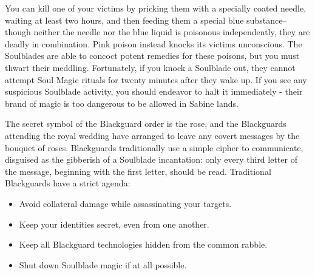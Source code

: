\documentclass[blue]{Kos}
\begin{document}
You can kill one of your victims by pricking them with a specially coated needle, waiting at least two hours, and then feeding them a special blue substance-- though neither the needle nor the blue liquid is poisonous independently, they are deadly in combination. Pink poison instead knocks its victims unconscious. The Soulblades are able to concoct potent remedies for these poisons, but you must thwart their meddling. Fortunately, if you knock a Soulblade out, they cannot attempt Soul Magic rituals for twenty minutes after they wake up. If you see any suspicious Soulblade activity, you should endeavor to halt it immediately - their brand of magic is too dangerous to be allowed in Sabine lands.

The secret symbol of the Blackguard order is the rose, and the Blackguards attending the royal wedding have arranged to leave any covert messages by the bouquet of roses. Blackguards traditionally use a simple cipher to communicate, disguised as the gibberish of a Soulblade incantation: only every third letter of the message, beginning with the first letter, should be read.  Traditional Blackguards have a strict agenda: 

\begin{itemize}
\item Avoid collateral damage while assassinating your targets.
\item Keep your identities secret, even from one another.
\item Keep all Blackguard technologies hidden from the common rabble.
\item Shut down Soulblade magic if at all possible.
\end{itemize}
\end{document}
